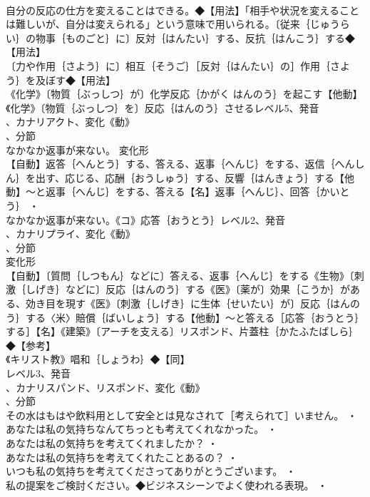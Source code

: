 \documentclass[8pt]{extreport}
\begin{document}
\begin{CJK}{UTF8}{min}
\\	自分の反応の仕方を変えることはできる。◆【用法】「相手や状況を変えることは難しいが、自分は変えられる」という意味で用いられる。〔従来｛じゅうらい｝の物事｛ものごと｝に〕反対｛はんたい｝する、反抗｛はんこう｝する◆【用法】
\\	〔力や作用｛さよう｝に〕相互｛そうご｝［反対｛はんたい｝の］作用｛さよう｝を及ぼす◆【用法】
\\	《化学》〔物質｛ぶっしつ｝が〕化学反応｛かがく はんのう｝を起こす【他動】《化学》〔物質｛ぶっしつ｝を〕反応｛はんのう｝させるレベル5、発音
\\	、カナリアクト、変化《動》
\\	、分節
\\	なかなか返事が来ない。	変化形 
\\	【自動】返答｛へんとう｝する、答える、返事｛へんじ｝をする、返信｛へんしん｝を出す、応じる、応酬｛おうしゅう｝する、反響｛はんきょう｝する【他動】～と返事｛へんじ｝をする、答える【名】返事｛へんじ｝、回答｛かいとう｝ ・
\\	なかなか返事が来ない。《コ》応答｛おうとう｝レベル2、発音
\\	、カナリプライ、変化《動》
\\	、分節
\\	変化形 
\\	【自動】〔質問｛しつもん｝などに〕答える、返事｛へんじ｝をする《生物》〔刺激｛しげき｝などに〕反応｛はんのう｝する《医》〔薬が〕効果｛こうか｝がある、効き目を現す《医》〔刺激｛しげき｝に生体｛せいたい｝が〕反応｛はんのう｝する〈米〉賠償｛ばいしょう｝する【他動】～と答える［応答｛おうとう｝する］【名】《建築》〔アーチを支える〕リスポンド、片蓋柱｛かたふたばしら｝◆【参考】
\\	《キリスト教》唱和｛しょうわ｝◆【同】
\\	レベル3、発音
\\	、カナリスパンド、リスポンド、変化《動》
\\	、分節
\\	その水はもはや飲料用として安全とは見なされて［考えられて］いません。 ・
\\	あなたは私の気持ちなんてちっとも考えてくれなかった。 ・
\\	あなたは私の気持ちを考えてくれましたか？ ・
\\	あなたは私の気持ちを考えてくれたことあるの？ ・
\\	いつも私の気持ちを考えてくださってありがとうございます。 ・
\\	私の提案をご検討ください。◆ビジネスシーンでよく使われる表現。 ・

\end{CJK}
\end{document}
